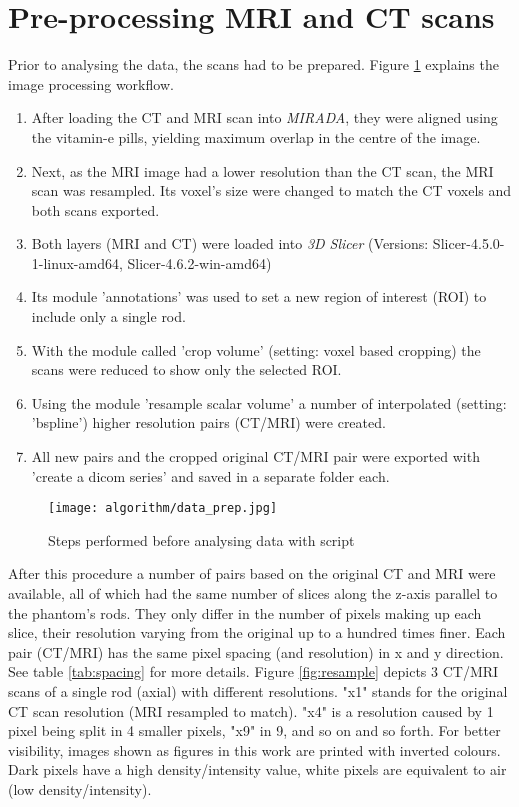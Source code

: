 \section{Pre-processing MRI and CT scans}
\label{sec:prep}

Prior to analysing the data, the scans had to be prepared.
Figure \ref{fig:data_prep} explains the image processing workflow.

\begin{enumerate}[label=\textbf{Step \arabic*}]
\item After loading the CT and MRI scan into \textit{MIRADA}, they were aligned using the vitamin-e pills, yielding maximum overlap in the centre of the image.
\item Next, as the MRI image had a lower resolution than the CT scan, the MRI scan was resampled.
Its voxel's size were changed to match the CT voxels and both scans exported.
\item Both layers (MRI and CT) were loaded into \textit{3D Slicer} (Versions: Slicer-4.5.0-1-linux-amd64, Slicer-4.6.2-win-amd64)
\item Its module 'annotations' was used to set a new region of interest (ROI) to include only a single rod.
\item With the module called 'crop volume' (setting: voxel based cropping) the scans were reduced to show only the selected ROI.
\item Using the module 'resample scalar volume' a number of interpolated (setting: 'bspline') higher resolution pairs (CT/MRI) were created.
\item All new pairs and the cropped original CT/MRI pair were exported with 'create a dicom series' and saved in a separate folder each.
\end{enumerate}

\begin{figure}[!tbp]
\centering
\texttt{[image: algorithm/data\_prep.jpg]}
\caption{Steps performed before analysing data with script }
\label{fig:data_prep}
\end{figure}

After this procedure a number of pairs based on the original CT and MRI were available, all of which had the same number of slices along the z-axis parallel to the phantom's rods.
They only differ in the number of pixels making up each slice, their resolution varying from the original up to a hundred times finer.
Each pair (CT/MRI) has the same pixel spacing (and resolution) in x and y direction.
See table \ref{tab:spacing} for more details.
Figure \ref{fig:resample} depicts 3 CT/MRI scans of a single rod (axial) with different resolutions.
"x1" stands for the original CT scan resolution (MRI resampled to match).
"x4" is a resolution caused by 1 pixel being split in 4 smaller pixels, "x9" in 9, and so on and so forth.
For better visibility, images shown as figures in this work are printed with inverted colours.
Dark pixels have a high density/intensity value, white pixels are equivalent to air (low density/intensity).

